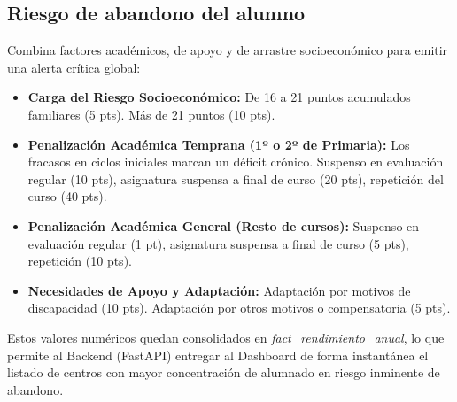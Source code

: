 \subsection{Riesgo de abandono del alumno}
Combina factores académicos, de apoyo y de arrastre socioeconómico para emitir una alerta crítica global:

\begin{itemize}
    \item \textbf{Carga del Riesgo Socioeconómico:} De 16 a 21 puntos acumulados familiares (5 pts). Más de 21 puntos (10 pts).
    \item \textbf{Penalización Académica Temprana (1º o 2º de Primaria):} Los fracasos en ciclos iniciales marcan un déficit crónico. Suspenso en evaluación regular (10 pts), asignatura suspensa a final de curso (20 pts), repetición del curso (40 pts).
    \item \textbf{Penalización Académica General (Resto de cursos):} Suspenso en evaluación regular (1 pt), asignatura suspensa a final de curso (5 pts), repetición (10 pts).
    \item \textbf{Necesidades de Apoyo y Adaptación:} Adaptación por motivos de discapacidad (10 pts). Adaptación por otros motivos o compensatoria (5 pts).
\end{itemize}

Estos valores numéricos quedan consolidados en \textit{fact\_rendimiento\_anual}, lo que permite al Backend (FastAPI) entregar al Dashboard de forma instantánea el listado de centros con mayor concentración de alumnado en riesgo inminente de abandono.
